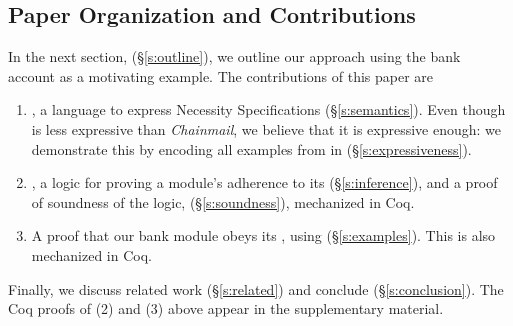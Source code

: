 \subsection{Paper Organization and Contributions}

In the next section, (\S\ref{s:outline}),  we outline our approach using the
bank account as  a motivating example. 
%
The contributions of this paper are\begin{enumerate}
 \item
\Chainspec, a language to
express Necessity Specifications (\S\ref{s:semantics}). Even though \Chainspec is
less expressive than  \emph{Chainmail}, we believe that it is expressive enough: we demonstrate this
by encoding all examples from \cite{FASE} in \Chainspec (\S\ref{s:expressiveness}). 
 \item
\Chainlogic, a logic for proving a module's adherence to its
 \NecessitySpecifications (\S\ref{s:inference}), and a proof of soundness of the logic, (\S\ref{s:soundness}),
 mechanized in Coq. 
 \item
A    proof that %
  our bank module obeys its \NecessitySpecification, using   \Chainlogic  (\S\ref{s:examples}). This is also mechanized in Coq.
\end{enumerate}
 
 
 


\noindent Finally, we discuss %
 related work (\S\ref{s:related}) and conclude (\S\ref{s:conclusion}).
The Coq proofs of 
(2) and (3) above %
appear in the
supplementary material.
